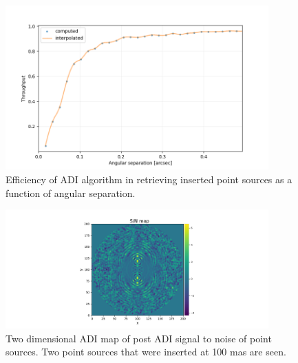 \begin{figure}[!ht]
  \centering
  \includegraphics[width=0.9\textwidth]{./figures/adi_throughput.png}
  \caption[Efficiency ADI algorithm point sources]{Efficiency of ADI algorithm in retrieving inserted point sources as a function of angular separation.}
  \label{fig:adi_6}
\end{figure}


\begin{figure}[!ht]
  \centering
  \includegraphics[width=0.9\textwidth]{./figures/adi_snrmap.png}
  \caption[Two dimensional ADI map of post ADI signal to noise of point sources]{Two dimensional ADI map of post ADI signal to noise of point sources. Two point sources that were inserted at 100 mas are seen.}
  \label{fig:adi_7}
\end{figure}


